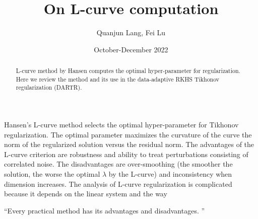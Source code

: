 \documentclass{article} %
\title{On L-curve computation}
\author{Quanjun Lang, Fei Lu}
\date{October-December 2022}
\theoremstyle{plain}
\numberwithin{equation}{section}
\begin{document}
\maketitle
\begin{abstract}
L-curve method by Hansen computes the optimal hyper-parameter for regularization.  Here we review the method and its use in the data-adaptive RKHS Tikhonov regularization (DARTR). 
\end{abstract}




Hansen's L-curve method \cite{hansen_LcurveIts_a} selects the optimal hyper-parameter for Tikhonov regularization. The optimal parameter maximizes the curvature of the curve the norm of the regularized solution versus the residual norm. The advantages of the L-curve criterion are robustness and ability to treat perturbations consisting of correlated noise. The disadvantages are over-smoothing (the smoother the solution, the worse the optimal $\lambda$ by the L-curve) and inconsistency when dimension increases. 
The analysis of L-curve regularization is complicated because it depends on the linear system and the way 

``Every practical method has its advantages and disadvantages. '' 
\end{document}
